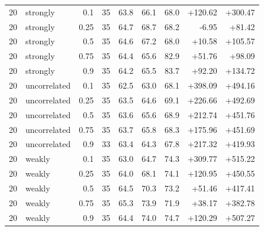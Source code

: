 \begin{tabular}{rlrrrrrrr}
20 & strongly & 0.1 & 35 & 63.8 & 66.1 & 68.0 & +120.62 & +300.47 \\
20 & strongly & 0.25 & 35 & 64.7 & 68.7 & 68.2 & -6.95 & +81.42 \\
20 & strongly & 0.5 & 35 & 64.6 & 67.2 & 68.0 & +10.58 & +105.57 \\
20 & strongly & 0.75 & 35 & 64.4 & 65.6 & 82.9 & +51.76 & +98.09 \\
20 & strongly & 0.9 & 35 & 64.2 & 65.5 & 83.7 & +92.20 & +134.72 \\
20 & uncorrelated & 0.1 & 35 & 62.5 & 63.0 & 68.1 & +398.09 & +494.16 \\
20 & uncorrelated & 0.25 & 35 & 63.5 & 64.6 & 69.1 & +226.66 & +492.69 \\
20 & uncorrelated & 0.5 & 35 & 63.6 & 65.6 & 68.9 & +212.74 & +451.76 \\
20 & uncorrelated & 0.75 & 35 & 63.7 & 65.8 & 68.3 & +175.96 & +451.69 \\
20 & uncorrelated & 0.9 & 33 & 63.4 & 64.3 & 67.8 & +217.32 & +419.93 \\
20 & weakly & 0.1 & 35 & 63.0 & 64.7 & 74.3 & +309.77 & +515.22 \\
20 & weakly & 0.25 & 35 & 64.0 & 68.1 & 74.1 & +120.95 & +450.55 \\
20 & weakly & 0.5 & 35 & 64.5 & 70.3 & 73.2 & +51.46 & +417.41 \\
20 & weakly & 0.75 & 35 & 65.3 & 73.9 & 71.9 & +38.17 & +382.78 \\
20 & weakly & 0.9 & 35 & 64.4 & 74.0 & 74.7 & +120.29 & +507.27 \\
\hline
\end{tabular}
